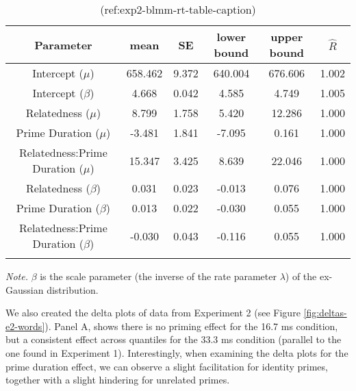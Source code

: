 \documentclass[
  english,
  man,floatsintext]{apa6}
\begin{document}
\begin{table}[H]

\begin{center}
\begin{threeparttable}

\caption{\label{tab:exp2-blmm-table}(ref:exp2-blmm-rt-table-caption)}

\small{

\begin{tabular}{cccccc}
\toprule
Parameter & \multicolumn{1}{c}{mean} & \multicolumn{1}{c}{SE} & \multicolumn{1}{c}{lower bound} & \multicolumn{1}{c}{upper bound} & \multicolumn{1}{c}{$\hat{R}$}\\
\midrule
Intercept ($\mu$) & 658.462 & 9.372 & 640.004 & 676.606 & 1.002\\
Intercept ($\beta$) & 4.668 & 0.042 & 4.585 & 4.749 & 1.005\\
Relatedness ($\mu$) & 8.799 & 1.758 & 5.420 & 12.286 & 1.000\\
Prime Duration ($\mu$) & -3.481 & 1.841 & -7.095 & 0.161 & 1.000\\
Relatedness:Prime Duration ($\mu$) & 15.347 & 3.425 & 8.639 & 22.046 & 1.000\\
Relatedness ($\beta$) & 0.031 & 0.023 & -0.013 & 0.076 & 1.000\\
Prime Duration ($\beta$) & 0.013 & 0.022 & -0.030 & 0.055 & 1.000\\
Relatedness:Prime Duration ($\beta$) & -0.030 & 0.043 & -0.116 & 0.055 & 1.000\\
\bottomrule
\addlinespace
\end{tabular}

}

\begin{tablenotes}[para]
\normalsize{\textit{Note.} $\beta$ is the scale parameter (the inverse of the rate parameter $\lambda$) of the ex-Gaussian distribution.}
\end{tablenotes}

\end{threeparttable}
\end{center}

\end{table}

We also created the delta plots of data from Experiment 2 (see Figure \ref{fig:deltas-e2-words}). Panel A, shows there is no priming effect for the 16.7 ms condition, but a consistent effect across quantiles for the 33.3 ms condition (parallel to the one found in Experiment 1). Interestingly, when examining the delta plots for the prime duration effect, we can observe a slight facilitation for identity primes, together with a slight hindering for unrelated primes.
\end{document}
